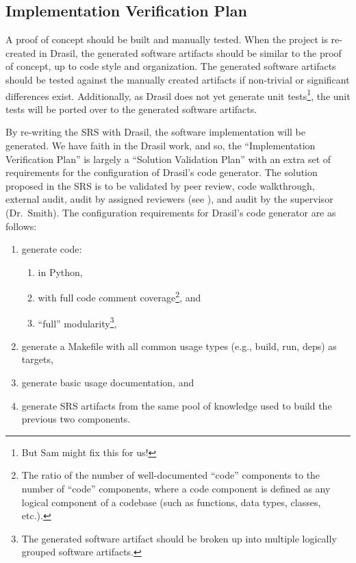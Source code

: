 \documentclass[12pt, titlepage]{article}
\begin{document}
\subsection{Implementation Verification Plan}

A proof of concept should be built and manually tested. When the project is
re-created in Drasil, the generated software artifacts should be similar to the
proof of concept, up to code style and organization. The generated software
artifacts should be tested against the manually created artifacts if non-trivial
or significant differences exist. Additionally, as Drasil does not yet generate
unit tests\footnote{But Sam might fix this for us!}, the unit tests will be
ported over to the generated software artifacts.

By re-writing the SRS with Drasil, the software implementation will be
generated. We have faith in the Drasil work, and so, the ``Implementation
Verification Plan'' is largely a ``Solution Validation Plan'' with an extra set
of requirements for the configuration of Drasil's code generator. The solution
proposed in the SRS is to be validated by peer review, code walkthrough,
external audit, audit by assigned reviewers (see ), and
audit by the supervisor (Dr.\ Smith). The configuration requirements for
Drasil's code generator are as follows:

\begin{enumerate}

    \item generate code:

          \begin{enumerate}

              \item in Python,

              \item with full code comment coverage\footnote{The ratio of the
                        number of well-documented ``code'' components to the
                        number of ``code'' components, where a code component is
                        defined as any logical component of a codebase (such as
                        functions, data types, classes, etc.).}, and

              \item ``full'' modularity\footnote{The generated software artifact
                        should be broken up into multiple logically grouped
                        software artifacts.},

          \end{enumerate}

    \item generate a Makefile with all common usage types (e.g., build, run,
          deps) as targets,

    \item generate basic usage documentation, and

    \item generate SRS artifacts from the same pool of knowledge used to build
          the previous two components.

\end{enumerate}
\end{document}

